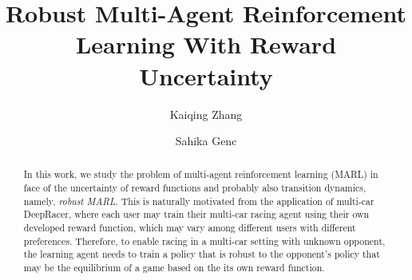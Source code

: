 \documentclass{article}
\author{Kaiqing Zhang \and Sahika Genc}
\begin{document}
\title{Robust Multi-Agent Reinforcement Learning With Reward Uncertainty}


\maketitle   
   
 


\begin{abstract}
In this work, we study the problem of multi-agent reinforcement learning (MARL) in face of the uncertainty of reward functions and probably also transition dynamics, namely, \emph{robust MARL}.  This is naturally motivated from the application of multi-car DeepRacer, where each user may train their multi-car racing agent using their own developed reward function, which may vary among different users with different preferences. Therefore, to enable racing in a multi-car setting with unknown opponent, the learning agent needs to train a policy that is robust to the opponent's policy that may be the equilibrium of a game based on the its own  reward function. 
\end{abstract}
 
 
 
 










% 




%


 

\newpage




\appendix




 
\end{document}
